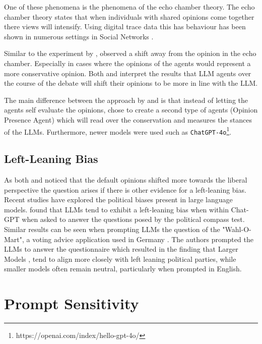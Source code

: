 One of these phenomena is the phenomena of the echo chamber theory. The echo chamber theory states that when individuals with shared opinions come together there views will intensify. Using digital trace data this has behaviour has been shown in numerous settings in Social Networks \citep{terren2021echo,mahmoudi2024echo, brugnoli2019recursive}. 

Similar to the experiment by \cite{taubenfeld_systematic_2024}, \cite{coppolillo_unmasking_2025} observed a shift away from the opinion in the echo chamber. Especially in cases where the opinions of the agents would represent a more conservative opinion. Both \cite{taubenfeld_systematic_2024} and \cite{coppolillo_unmasking_2025} interpret the results that LLM agents over the course of the debate will shift their opinions to be more in line with the LLM. 

The main difference between the approach by \cite{taubenfeld_systematic_2024} and \cite{coppolillo_unmasking_2025} is that instead of letting the agents self evaluate the opinions, \cite{coppolillo_unmasking_2025} chose to create a second type of agents (Opinion Presence Agent) which will read over the conservation and measures the stances of the LLMs. Furthermore, newer models were used such as \texttt{ChatGPT-4o}\footnote{https://openai.com/index/hello-gpt-4o/}.


\subsection{Left-Leaning Bias}

As both \cite{taubenfeld_systematic_2024} and \cite{coppolillo_unmasking_2025} noticed that the default opinions shifted more towards the liberal perspective the question arises if there is other evidence for a left-leaning bias. Recent studies have explored the political biases present in large language models. \citet{rutinowski2024self} found that LLMs tend to exhibit a left-leaning bias when within Chat-GPT when asked to answer the questions posed by the political compass test. Similar results can be seen when prompting LLMs the question of the "Wahl-O-Mart", a voting advice application used in Germany \citep{rettenberger2025assessing}. The authors prompted the LLMs to answer the questionnaire which resulted in the finding that Larger Models , tend to align more closely with left leaning political parties, while smaller models often remain neutral, particularly when prompted in English.


\section{Prompt Sensitivity}

